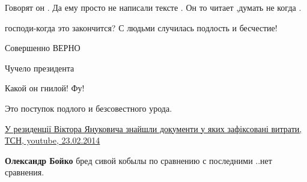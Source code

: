\begin{itemize}
Говорят он .
Да ему просто не написали тексте .
Он то читает ,думать не когда .

 
господи-когда это закончится? С людьми случилась подлость и бесчестие!

 
Совершенно ВЕРНО

 
Чучело президента

 
Какой он гнилой! Фу!

 
Это поступок подлого и безсовестного урода.

 

\href{https://youtu.be/qg2wymqd_7Y}{%
У резиденції Віктора Януковича знайшли документи у яких зафіксовані витрати, ТСН, %
youtube, 23.02.2014%
}

\begin{itemize}
 
\textbf{Олександр Бойко} бред сивой кобылы по сравнению с последними
..нет сравнения.
\end{itemize}


\end{itemize}

